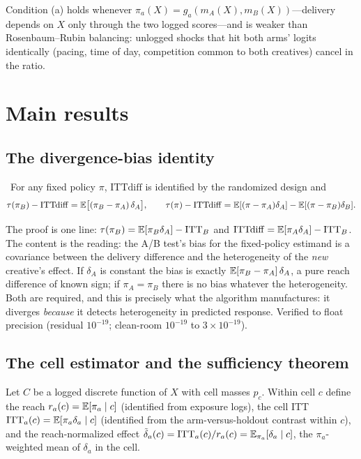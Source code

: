 Condition (a) holds whenever $\pi_a(X) = g_a(m_A(X), m_B(X))$---delivery depends on $X$ only through the two logged scores---and is weaker than Rosenbaum--Rubin balancing: unlogged shocks that hit both arms' logits identically (pacing, time of day, competition common to both creatives) cancel in the ratio.

\section{Main results}

\subsection{The divergence-bias identity}

\begin{theorem}
\label{algo:thm:identity}
\tagEstablished\ For any fixed policy $\pi$, $\mathrm{ITTdiff}$ is identified by the randomized design and
\begin{equation}
\tau(\pi_B) - \mathrm{ITTdiff} = \mathbb{E}\big[(\pi_B - \pi_A)\,\delta_A\big], \qquad
\tau(\pi) - \mathrm{ITTdiff} = \mathbb{E}[(\pi - \pi_A)\delta_A] - \mathbb{E}[(\pi - \pi_B)\delta_B].
\label{eq:algo:identity}
\end{equation}
\end{theorem}

The proof is one line: $\tau(\pi_B) = \mathbb{E}[\pi_B\delta_A] - \mathrm{ITT}_B$ and $\mathrm{ITTdiff} = \mathbb{E}[\pi_A\delta_A] - \mathrm{ITT}_B$. The content is the reading: the A/B test's bias for the fixed-policy estimand is a covariance between the delivery difference and the heterogeneity of the \emph{new} creative's effect. If $\delta_A$ is constant the bias is exactly $\mathbb{E}[\pi_B - \pi_A]\,\delta_A$, a pure reach difference of known sign; if $\pi_A = \pi_B$ there is no bias whatever the heterogeneity. Both are required, and this is precisely what the algorithm manufactures: it diverges \emph{because} it detects heterogeneity in predicted response. Verified to float precision (residual $10^{-19}$; clean-room $10^{-19}$ to $3\times10^{-19}$).

\subsection{The cell estimator and the sufficiency theorem}

Let $C$ be a logged discrete function of $X$ with cell masses $p_c$. Within cell $c$ define the reach $r_a(c) = \mathbb{E}[\pi_a \mid c]$ (identified from exposure logs), the cell ITT $\mathrm{ITT}_a(c) = \mathbb{E}[\pi_a\delta_a \mid c]$ (identified from the arm-versus-holdout contrast within $c$), and the reach-normalized effect $\tilde\delta_a(c) = \mathrm{ITT}_a(c)/r_a(c) = \mathbb{E}_{\pi_a}[\delta_a \mid c]$, the $\pi_a$-weighted mean of $\delta_a$ in the cell.

